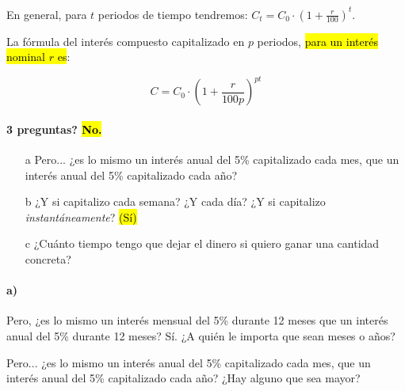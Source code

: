 En general, para $t$ periodos de tiempo tendremos: $C_t = C_0·\left(1+\frac{r}{100}\right)^t$.

La fórmula del interés compuesto capitalizado en $p$ periodos, \hl{para un interés nominal $r$ es}: 

\[C = C_0·\left(1+\frac{r}{100p}\right)^{pt}\]


\paragraph{3 preguntas? \hl{No.}}
\begin{itemize}
	\item[a] Pero... ¿es lo mismo un interés anual del 5\% capitalizado cada mes, que un interés anual del 5\% capitalizado cada año?

	\item[b] ¿Y si capitalizo cada semana? ¿Y cada día? ¿Y si capitalizo \textit{instantáneamente}? \hl{(Sí)}

	\item[c] ¿Cuánto tiempo tengo que dejar el dinero si quiero ganar una cantidad concreta?
\end{itemize}

\paragraph{a)}
Pero, ¿es lo mismo un interés mensual del 5\% durante 12 meses que un interés anual del 5\% durante 12 meses? Sí. ¿A quién le importa que sean meses o años?

Pero... ¿es lo mismo un interés anual del 5\% capitalizado cada mes, que un interés anual del 5\% capitalizado cada año? ¿Hay alguno que sea mayor? 

